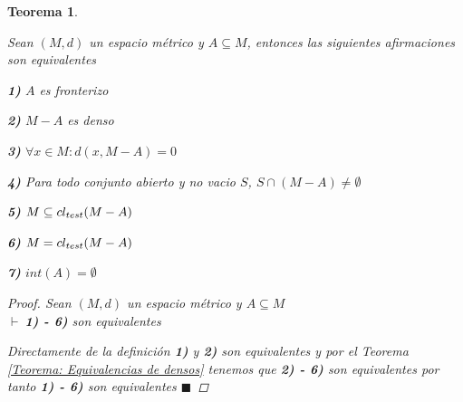 \documentclass[oneside]{book} %
\theoremstyle{Teorema}
\newtheorem{Teorema}[Definicion]{Teorema}
\theoremstyle{Ejemplos}
\theoremstyle{[Obs]}
\def \test {test}
\newcommand{\cerradura}[2][\test]{\ifx \test #1 {\overline{#2}} \else {cl_{#1}(#2)} \fi} %
\renewcommand{\{}{\left\lbrace} %
\renewcommand{\}}{\right\rbrace} %
\newcommand{\n}{\cap} %
\renewcommand{\sc}{\subseteq} %
\renewcommand{\qed}{$\blacksquare$} %
\newcommand{\pd}{$\vdash\ $} %
\begin{document}
			\begin{Teorema}\label{Teorema: Equivalencias de fronterizos}\setlength{\parindent}{0em}
			
				Sean $(M, d)$ un espacio métrico y $A \sc M$, entonces las siguientes afirmaciones son equivalentes 

				\textbf{1)} $A$ es fronterizo 

				\textbf{2)} $M - A$ es denso

				\textbf{3)} $\forall x \in M : d(x, M - A) = 0$

				\textbf{4)} Para todo conjunto abierto y no vacio $S$, $S \n (M - A) \neq \emptyset$

				\textbf{5)} $M \sc \cerradura{M - A}$
				
				\textbf{6)} $M = \cerradura{M - A}$

				\textbf{7)} $int(A) = \emptyset$ 

				\begin{proof}
					
					Sean $(M, d)$ un espacio métrico y $A \sc M$ \\ 
					\pd \textbf{1) - 6)} son equivalentes 

					Directamente de la definición \textbf{1)} y \textbf{2)} son equivalentes y por el Teorema \ref{Teorema: Equivalencias de densos} tenemos que \textbf{2) - 6)} son equivalentes por tanto \textbf{1) - 6)} son equivalentes \qed 

				\end{proof}
			
			\end{Teorema}
\end{document}
